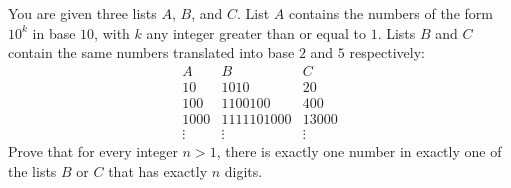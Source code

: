 You are given three lists $A$, $B$, and $C$.  List $A$ contains the numbers of the form $10^k$ in base $10$, with $k$ any integer greater than or equal to $1$.  Lists $B$ and $C$ contain the same numbers translated into base $2$ and $5$ respectively: \[\begin{array}{lll} A & B & C \\ 10 & 1010 & 20 \\ 100 & 1100100 & 400 \\ 1000 & 1111101000 & 13000 \\ \vdots & \vdots & \vdots \end{array}\] Prove that for every integer $n > 1$, there is exactly one number in exactly one of the lists $B$ or $C$ that has exactly $n$ digits.